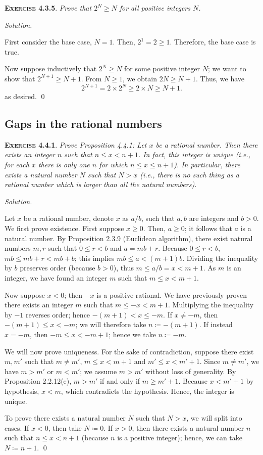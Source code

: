 \documentclass[12pt]{article}
\theoremstyle{remark}
\newenvironment{exer}[2]{
    \noindent \setlength{\parskip}{1em}%
    \textsc{\textbf{Exercise #1}}. \textit{#2} \par
    \noindent \textit{Solution.} %
}{\bigskip}
\begin{document}
\begin{exer}{4.3.5}{
    Prove that $2^N \ge N$ for all positive integers $N$.
}
    First consider the base case, $N = 1$.
    Then, $2^1 = 2 \ge 1$.
    Therefore, the base case is true.

    Now suppose inductively that $2^N \ge N$ for some positive integer $N$; we want to show that $2^{N+1} \ge N + 1$.
    From $N \ge 1$, we obtain $2N \ge N + 1$.
    Thus, we have 
    \[
        2^{N + 1} = 2 \times 2^N \ge 2 \times N \ge N + 1.
    \]
    as desired. \qed
\end{exer}


\subsection{Gaps in the rational numbers}

\begin{exer}{4.4.1}{
    Prove Proposition 4.4.1:
    Let $x$ be a rational number.
    Then there exists an integer $n$ such that $n \le x < n+1$.
    In fact, this integer is unique (i.e., for each $x$ there is only one $n$ for which $n \le x \le n + 1$).
    In particular, there exists a natural number $N$ such that $N > x$ (i.e., there is no such thing as a rational number which is larger than all the natural numbers).
}
    Let $x$ be a rational number, denote $x$ as $a / b$, such that $a, b$ are integers and $b > 0$.
    We first prove existence.
    First suppose $x \ge 0$.
    Then, $a \ge 0$; it follows that $a$ is a natural number.
    By Proposition 2.3.9 (Euclidean algorithm), there exist natural numbers $m, r$ such that $0 \le r < b$ and $a = mb + r$.
    Because $0 \le r < b$, $mb \le mb + r < mb + b$; this implies $mb \le a < (m+1)b$.
    Dividing the inequality by $b$ preserves order (because $b > 0$), thus $m \le a / b = x < m+1$.
    As $m$ is an integer, we have found an integer $m$ such that $m \le x < m+1$.

    Now suppose $x < 0$; then $-x$ is a positive rational.
    We have previously proven there exists an integer $m$ such that $m \le -x < m+1$.
    Multiplying the inequality by $-1$ reverses order; hence $-(m + 1) < x \le -m$.
    If $x \ne -m$, then $-(m + 1) \le x < -m$; we will therefore take $n \coloneqq -(m + 1)$.
    If instead $x = -m$, then $-m \le x < -m + 1$; hence we take $n \coloneqq -m$.

    We will now prove uniqueness.
    For the sake of contradiction, suppose there exist $m, m'$ such that $m \ne m'$, $m \le x < m + 1$ and $m' \le x < m' + 1$.
    Since $m \ne m'$, we have $m > m'$ or $m < m'$; we assume $m > m'$ without loss of generality.
    By Proposition 2.2.12(e), $m > m'$ if and only if $m \ge m' + 1$.
    Because $x < m' + 1$ by hypothesis, $x < m$, which contradicts the hypothesis.
    Hence, the integer is unique.

    To prove there exists a natural number $N$ such that $N > x$, we will split into cases.
    If $x < 0$, then take $N \coloneqq 0$.
    If $x > 0$, then there exists a natural number $n$ such that $n \le x < n + 1$ (because $n$ is a positive integer); hence, we can take $N \coloneqq n + 1$. \qed
\end{exer}
\end{document}
